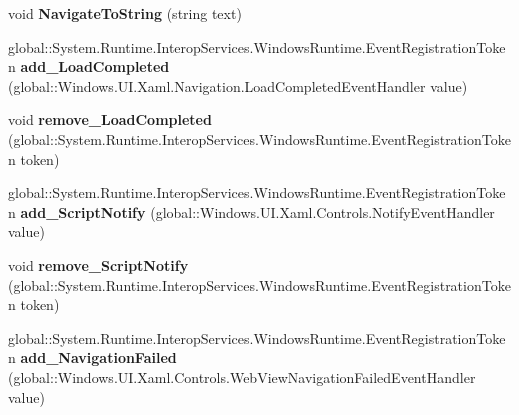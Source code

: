 \begin{DoxyCompactItemize}
\mbox{\label{interface_windows_1_1_u_i_1_1_xaml_1_1_controls_1_1_i_web_view_a5d3ada22753e211f63167cbea88d12f7}} 
void {\bfseries Navigate\+To\+String} (string text)
\item 
\mbox{\label{interface_windows_1_1_u_i_1_1_xaml_1_1_controls_1_1_i_web_view_a13cd0995f18f6d179d71abd176ff1dba}} 
global\+::\+System.\+Runtime.\+Interop\+Services.\+Windows\+Runtime.\+Event\+Registration\+Token {\bfseries add\+\_\+\+Load\+Completed} (global\+::\+Windows.\+U\+I.\+Xaml.\+Navigation.\+Load\+Completed\+Event\+Handler value)
\item 
\mbox{\label{interface_windows_1_1_u_i_1_1_xaml_1_1_controls_1_1_i_web_view_af38e4aa4ca0e989fc46d0f629fd7564e}} 
void {\bfseries remove\+\_\+\+Load\+Completed} (global\+::\+System.\+Runtime.\+Interop\+Services.\+Windows\+Runtime.\+Event\+Registration\+Token token)
\item 
\mbox{\label{interface_windows_1_1_u_i_1_1_xaml_1_1_controls_1_1_i_web_view_aadb8186d118d49d86ee192f2534cac58}} 
global\+::\+System.\+Runtime.\+Interop\+Services.\+Windows\+Runtime.\+Event\+Registration\+Token {\bfseries add\+\_\+\+Script\+Notify} (global\+::\+Windows.\+U\+I.\+Xaml.\+Controls.\+Notify\+Event\+Handler value)
\item 
\mbox{\label{interface_windows_1_1_u_i_1_1_xaml_1_1_controls_1_1_i_web_view_a9bb7e1887eef12d9c592c4b27677ac47}} 
void {\bfseries remove\+\_\+\+Script\+Notify} (global\+::\+System.\+Runtime.\+Interop\+Services.\+Windows\+Runtime.\+Event\+Registration\+Token token)
\item 
\mbox{\label{interface_windows_1_1_u_i_1_1_xaml_1_1_controls_1_1_i_web_view_ac5c8918c61695196369083e55461e2ae}} 
global\+::\+System.\+Runtime.\+Interop\+Services.\+Windows\+Runtime.\+Event\+Registration\+Token {\bfseries add\+\_\+\+Navigation\+Failed} (global\+::\+Windows.\+U\+I.\+Xaml.\+Controls.\+Web\+View\+Navigation\+Failed\+Event\+Handler value)

\end{DoxyCompactItemize}
